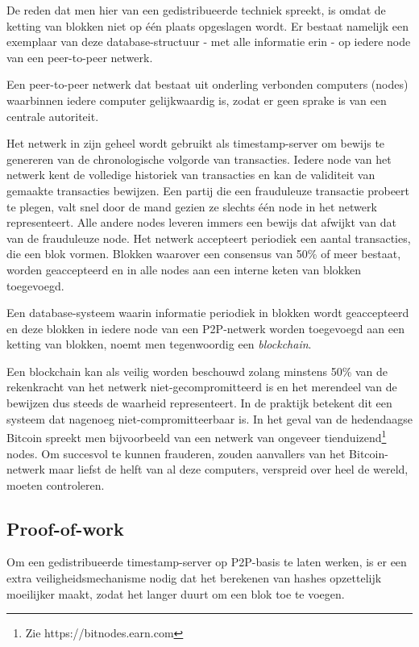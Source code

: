 	De reden dat men hier van een gedistribueerde techniek spreekt, is omdat de ketting van blokken niet op één plaats opgeslagen wordt. Er bestaat namelijk een exemplaar van deze database-structuur - met alle informatie erin - op iedere node van een peer-to-peer netwerk. 
	
	Een peer-to-peer netwerk dat bestaat uit onderling verbonden computers (nodes) waarbinnen iedere computer gelijkwaardig is, zodat er geen sprake is van een centrale autoriteit. 
	
	Het netwerk in zijn geheel wordt gebruikt als timestamp-server om bewijs te genereren van de chronologische volgorde van transacties. Iedere node van het netwerk kent de volledige historiek van transacties en kan de validiteit van gemaakte transacties bewijzen. Een partij die een frauduleuze transactie probeert te plegen, valt snel door de mand gezien ze slechts één node in het netwerk representeert. Alle andere nodes leveren immers een bewijs dat afwijkt van dat van de frauduleuze node. Het netwerk accepteert periodiek een aantal transacties, die een blok vormen. Blokken waarover een consensus van 50\% of meer bestaat, worden geaccepteerd en in alle nodes aan een interne keten van blokken toegevoegd.
	
	Een database-systeem waarin informatie periodiek in blokken wordt geaccepteerd en deze blokken in iedere node van een P2P-netwerk worden toegevoegd aan een ketting van blokken, noemt men tegenwoordig een \textit{blockchain}.
	
	Een blockchain kan als veilig worden beschouwd zolang minstens 50\% van de rekenkracht van het netwerk niet-gecompromitteerd is en het merendeel van de bewijzen dus steeds de waarheid representeert. In de praktijk betekent dit een systeem dat nagenoeg niet-compromitteerbaar is. In het geval van de hedendaagse Bitcoin spreekt men bijvoorbeeld van een netwerk van ongeveer tienduizend\footnote{Zie https://bitnodes.earn.com} nodes. Om succesvol te kunnen frauderen, zouden aanvallers van het Bitcoin-netwerk maar liefst de helft van al deze computers, verspreid over heel de wereld, moeten controleren. 
			
	\subsection{Proof-of-work}
	\label{subsec:pow}
	Om een gedistribueerde timestamp-server op P2P-basis te laten werken, is er een extra veiligheidsmechanisme nodig dat het berekenen van hashes opzettelijk moeilijker maakt, zodat het langer duurt om een blok toe te voegen. 
	

